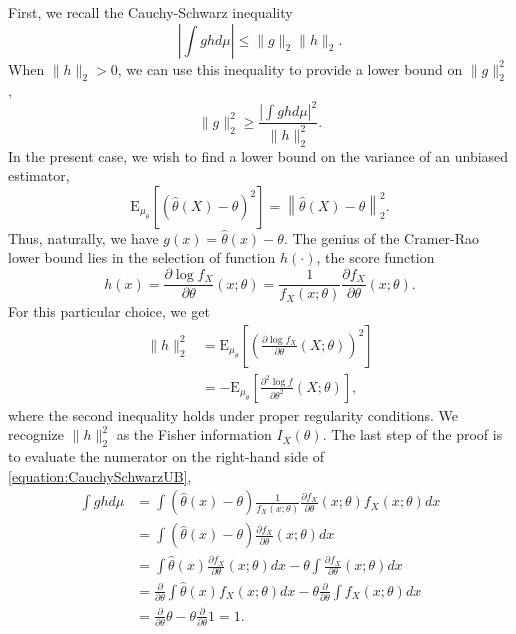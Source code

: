 First, we recall the Cauchy-Schwarz inequality
\begin{equation*}
\left| \int g h d\mu \right| \leq \| g \|_2 \| h \|_2 .
\end{equation*}
When $\| h \|_2 > 0$, we can use this inequality to provide a lower bound on $\| g \|_2^2$,
\begin{equation} \label{equation:CauchySchwarzUB}
\| g \|_2^2 \geq \frac{ \left| \int g h d\mu \right|^2 }{ \| h \|_2^2} .
\end{equation}
In the present case, we wish to find a lower bound on the variance of an unbiased estimator,
\begin{equation*}
\mathrm{E}_{\mu_{\theta}} \left[ \left( \hat{\theta} (X) - \theta \right)^2 \right]
= \left\| \hat{\theta} (X) - \theta \right\|_2^2 .
\end{equation*}
Thus, naturally, we have $g(x) = \hat{\theta}(x) - \theta$.
The genius of the Cramer-Rao lower bound lies in the selection of function $h (\cdot)$, the score function
\begin{equation*}
h(x) = \frac{\partial \log f_X}{\partial \theta} (x; \theta)
= \frac{1}{f_X (x; \theta)} \frac{\partial f_X}{\partial \theta} (x; \theta) .
\end{equation*}
For this particular choice, we get
\begin{equation*}
\begin{split}
\| h \|_2^2
&= \mathrm{E}_{\mu_{\theta}} \left[ \left( \frac{\partial \log f_X}{\partial \theta} (X; \theta) \right)^2 \right] \\
&= - \mathrm{E}_{\mu_{\theta}} \left[ \frac{\partial^2 \log f}{\partial \theta^2} (X; \theta) \right] ,
\end{split}
\end{equation*}
where the second inequality holds under proper regularity conditions.
We recognize $\| h \|_2^2$ as the Fisher information $I_X(\theta)$.
The last step of the proof is to evaluate the numerator on the right-hand side of \eqref{equation:CauchySchwarzUB},
\begin{equation*}
\begin{split}
\int g h d\mu
&= \int \left( \hat{\theta}(x) - \theta \right)
\frac{1}{f_X (x; \theta)} \frac{\partial f_X}{\partial \theta} (x; \theta)
f_X (x; \theta) dx \\
&= \int \left( \hat{\theta}(x) - \theta \right)
\frac{\partial f_X}{\partial \theta} (x; \theta) dx \\
&= \int \hat{\theta}(x) \frac{\partial f_X}{\partial \theta} (x; \theta) dx
- \theta \int \frac{\partial f_X}{\partial \theta} (x; \theta) dx \\
&= \frac{\partial}{\partial \theta} \int \hat{\theta}(x) f_X (x; \theta) dx
- \theta \frac{\partial}{\partial \theta} \int f_X (x; \theta) dx \\
&= \frac{\partial}{\partial \theta} \theta - \theta \frac{\partial}{\partial \theta} 1
= 1 .
\end{split}
\end{equation*}
